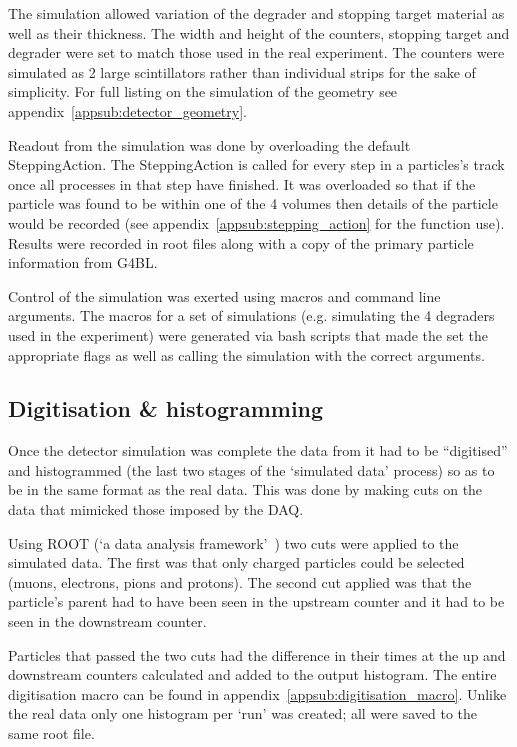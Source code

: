 \documentclass[]{article}
\begin{document}
The simulation allowed variation of the degrader and stopping target material as well as their thickness. The width and height of the counters, stopping target and degrader were set to match those used in the real experiment. The counters were simulated as 2 large scintillators rather than individual strips for the sake of simplicity. For full listing on the simulation of the geometry see appendix~\ref{appsub:detector_geometry}.

Readout from the simulation was done by overloading the default SteppingAction. The SteppingAction is called for every step in a particles's track once all processes in that step have finished. It was overloaded so that if the particle was found to be within one of the 4 volumes then details of the particle would be recorded (see appendix~\ref{appsub:stepping_action} for the function use). Results were recorded in root files along with a copy of the primary particle information from G4BL. 

Control of the simulation was exerted using macros and command line arguments. The macros for a set of simulations (e.g. simulating the 4 degraders used in the experiment) were generated via bash scripts that made the set the appropriate flags as well as calling the simulation with the correct arguments.
\subsection{Digitisation \& histogramming} %
\label{sub:digitisation_histogramming}
Once the detector simulation was complete the data from it had to be ``digitised'' and histogrammed (the last two stages of the `simulated data' process) so as to be in the same format as the real data. This was done by making cuts on the data that mimicked those imposed by the DAQ. 

Using ROOT (`a data analysis framework'~\cite{Brun199781}) two cuts were applied to the simulated data. The first was that only charged particles could be selected (muons, electrons, pions and protons). The second cut applied was that the particle's parent had to have been seen in the upstream counter and it had to be seen in the downstream counter. 

Particles that passed the two cuts had the difference in their times at the up and downstream counters calculated and added to the output histogram. The entire digitisation macro can be found in appendix~\ref{appsub:digitisation_macro}. Unlike the real data only one histogram per `run' was created; all were saved to the same root file.
\end{document}
